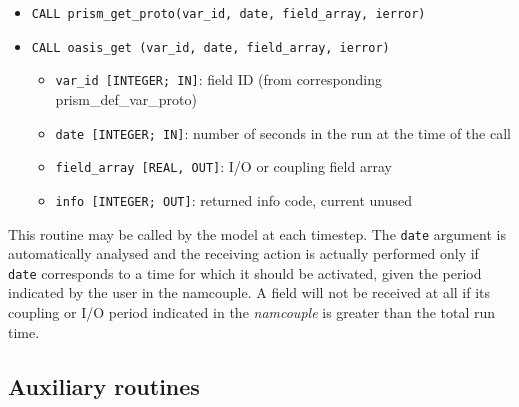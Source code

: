\begin{itemize} 

\item {\tt CALL prism\_get\_proto(var\_id, date, field\_array, ierror)}
\item {\tt CALL oasis\_get       (var\_id, date, field\_array, ierror)}
\begin{itemize}
\item {\tt var\_id [INTEGER; IN]}: field ID (from
  corresponding prism\_def\_var\_proto)
\item {\tt date [INTEGER; IN]}: number of seconds in the run at the
time of the call
\item {\tt field\_array [REAL, OUT]}: I/O or coupling field array 
\item {\tt info [INTEGER; OUT]}: returned info code, current unused
\end{itemize}
\end{itemize}

This routine may be called by the model at each timestep. The {\tt date}
argument is automatically analysed and the receiving action is actually
performed only if {\tt date} corresponds to a time for which it should
be activated, given the period indicated by the user in the
namcouple. A field will not be received at all if its
coupling or I/O period indicated in the {\it namcouple} is greater
than the total run time.

\subsection{Auxiliary routines}
\label{subsec:auxiliary}

